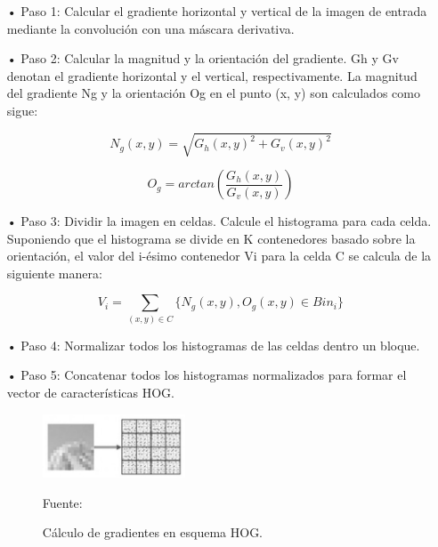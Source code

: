 \begin{itemize}
\item[•] Paso 1: Calcular el gradiente horizontal y vertical de la imagen de entrada mediante la convolución con una máscara derivativa.
\item[•] Paso 2: Calcular la magnitud y la orientación del gradiente. Gh y Gv denotan el gradiente horizontal y el vertical, respectivamente. La magnitud del gradiente Ng y la orientación Og en el punto (x, y) son calculados como sigue:

\begin{equation}
N_{g}(x,y)=\sqrt{G_{h}(x,y)^2+G_{v}(x,y)^2} 
\end{equation}

\begin{equation}
O_{g}=arctan(\frac{G_{h}(x,y)}{G_{v}(x,y)})
\end{equation}

\item[•] Paso 3: Dividir la imagen en celdas. Calcule el histograma para cada celda. Suponiendo que el histograma se divide en K contenedores basado sobre la orientación, el valor del i-ésimo contenedor Vi para la celda C se calcula de la siguiente manera:

\begin{equation}
V_{i}=\sum_{(x,y)\in C} \{ {N_g(x,y), O_g(x,y)\in Bin_i} \}
\end{equation}

\item[•] Paso 4: Normalizar todos los histogramas de las celdas dentro un bloque.
\item[•] Paso 5: Concatenar todos los histogramas normalizados para formar el vector de características HOG.

\begin{figure}[ht]
\begin{center}
\includegraphics[width=0.4\textwidth]{Imagen19}
\end{center}
\begin{center}
\vskip -0.5cm
\caption{\small{Cálculo de gradientes en esquema HOG.}}
{\small{Fuente: \cite{FALTA}}}
\end{center}
\end{figure}

\end{itemize}

